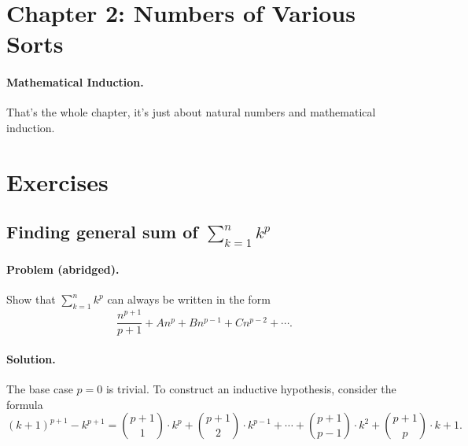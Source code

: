 \documentclass{article}
\begin{document}
\section{Chapter 2: Numbers of Various Sorts}

\paragraph{Mathematical Induction.} That's the whole chapter, it's just about natural numbers and mathematical induction.

\section{Exercises}

\setcounter{subsection}{6}
\subsection{Finding general sum of $\sum^n_{k=1} k^p$}

\paragraph{Problem (abridged).} Show that $\sum^n_{k=1} k^p$ can always be written in the form \begin{equation*}
  \frac{n^{p+1}}{p + 1} + An^p + Bn^{p-1} + Cn^{p-2} + \cdots.
\end{equation*}

\paragraph{Solution.} The base case $p = 0$ is trivial. To construct an inductive hypothesis, consider the formula \begin{equation*}
  (k + 1)^{p+1} - k^{p+1} = \binom{p+1}{1} \cdot k^p + \binom{p+1}{2} \cdot k^{p-1} + \cdots + \binom{p+1}{p-1} \cdot k^2 + \binom{p+1}{p} \cdot k + 1.
\end{equation*}
\end{document}
